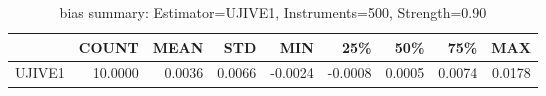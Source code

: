 \begin{table}[ht]
\centering
\caption{bias summary: Estimator=UJIVE1, Instruments=500, Strength=0.90}
\begin{tabular}{lrrrrrrrr}
\toprule
 & COUNT & MEAN & STD & MIN & 25\% & 50\% & 75\% & MAX \\
\midrule
UJIVE1 & 10.0000 & 0.0036 & 0.0066 & -0.0024 & -0.0008 & 0.0005 & 0.0074 & 0.0178 \\
\bottomrule
\end{tabular}
\end{table}
